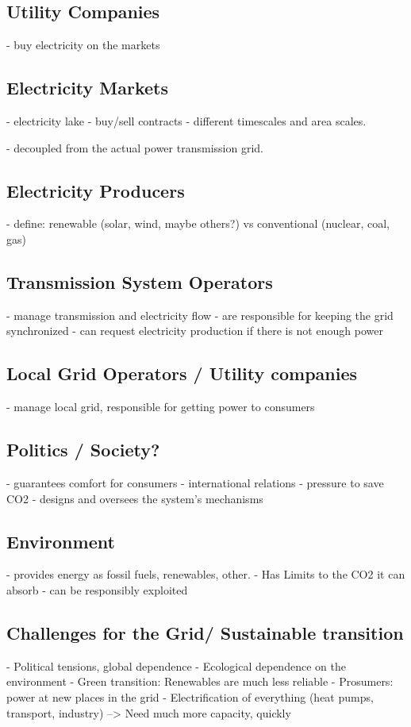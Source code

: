 \subsection{Utility Companies}
- buy electricity on the markets

\subsection{Electricity Markets}
- electricity lake
- buy/sell contracts
- different timescales and area scales.

- decoupled from the actual power transmission grid.

\subsection{Electricity Producers}
- define: renewable (solar, wind, maybe others?) vs conventional (nuclear, coal, gas)

\subsection{Transmission System Operators}
- manage transmission and electricity flow
- are responsible for keeping the grid synchronized
- can request electricity production if there is not enough power


\subsection{Local Grid Operators / Utility companies}
- manage local grid, responsible for getting power to consumers

\subsection{Politics / Society?}
- guarantees comfort for consumers
- international relations
- pressure to save CO2
- designs and oversees the system's mechanisms

\subsection{Environment}
- provides energy as fossil fuels, renewables, other.
- Has Limits to the CO2 it can absorb
- can be responsibly exploited

\subsection{Challenges for the Grid/ Sustainable transition}
- Political tensions, global dependence
- Ecological dependence on the environment
- Green transition: Renewables are much less reliable
- Prosumers: power at new places in the grid
- Electrification of everything (heat pumps, transport, industry) --> Need much more capacity, quickly

